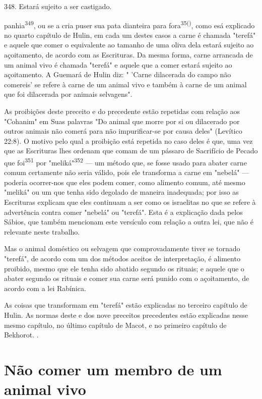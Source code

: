 \begin{itemize}
\begin{enumrate}
\begin{itemize}
\begin{itemize}
\begin{itemize}
348. Estará sujeito a ser castigado.

panhia\textsuperscript{349}, ou se a cria puser sua pata dianteira para
fora\textsuperscript{35()}, como esá explica­do no quarto capítulo de
Hulin, em cada um destes casos a carne é chamada "terefá" e aquele que
comer o equivalente ao tamanho de uma oliva dela estará sujeito ao
açoitamento, de acordo com as Escrituras. Da mesma forma, carne
arrancada de um animal vivo é chamada "terefá" e aquele que a comer
estará sujeito ao açoitamento. A Guemará de Hulin diz: " 'Carne
dilacerada do campo não comereis' se refere à carne de um animal vivo e
também à carne de um animal que foi dilacerada por animais selvagens".

As proibições deste preceito e do precedente estão repetidas com relação
aos "Cohanim" em Suas palavras "Do animal que morre por si ou
dila­cerado por outros animais não comerá para não impurificar-se por
causa de­les" (Levítico 22:8). O motivo pelo qual a proibição está
repetida no caso deles é que, uma vez que as Escrituras lhes ordenam que
comam de um pássaro de Sacrifício de Pecado que foi\textsuperscript{351}
por "meliká"\textsuperscript{352} --- um método que, se fosse usado para
abater carne comum certamente não seria válido, pois ele transfor­ma a
carne em "nebelá" --- poderia ocorrer-nos que eles podem comer, como
alimento comum, até mesmo "meliká" ou um que tenha sido degolado de
ma­neira inadequada; por isso as Escrituras explicam que eles continuam
a ser co­mo os israelitas no que se refere à advertência contra comer
"nebelá" ou "tere­fá". Esta é a explicação dada pelos Sábios, que também
mencionam este versí­culo com relação a outra lei, que não é relevante
neste trabalho.

Mas o animal doméstico ou selvagem que comprovadamente tiver se tornado
"terefá", de acordo com um dos métodos aceitos de interpretação, é
alimento proibido, mesmo que ele tenha sido abatido segundo os rituais;
e aquele que o abater segundo os rituais e comer sua carne será punido
com o açoitamento, de acordo com a lei Rabínica.

As coisas que transformam em "terefá" estão explicadas no terceiro
capítulo de Hulin. As normas deste e dos nove preceitos precedentes
estão ex­plicadas nesse mesmo capítulo, no último capítulo de Macot, e
no primeiro ca­pítulo de Bekhorot. .

\section{Não comer um membro de um animal vivo}


\end{itemize}
\end{itemize}
\end{itemize}
\end{enumrate}
\end{itemize}
